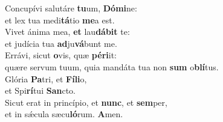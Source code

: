 \evenverse Concupívi salutáre \textbf{tu}um, \textbf{Dó}\textbf{mi}ne:~\*\\
\evenverse et lex tua medi\textbf{tá}tio \textbf{me}a est.\\
\oddverse Vivet ánima mea, \textbf{et} lau\textbf{dá}\textbf{bit} te:~\*\\
\oddverse et judícia tua \textbf{ad}ju\textbf{vá}bunt me.\\
\evenverse Errávi, sicut \textbf{o}vis, quæ \textbf{pé}\textbf{ri}it:~\*\\
\evenverse quære servum tuum, quia mandáta tua non \textbf{sum} o\textbf{blí}tus.\\
\oddverse Glória \textbf{Pa}tri, et \textbf{Fí}\textbf{li}o,~\*\\
\oddverse et Spi\textbf{rí}tui \textbf{San}cto.\\
\evenverse Sicut erat in princípio, et \textbf{nunc}, et \textbf{sem}per,~\*\\
\evenverse et in sǽcula sæcu\textbf{ló}rum. \textbf{A}men.\\
